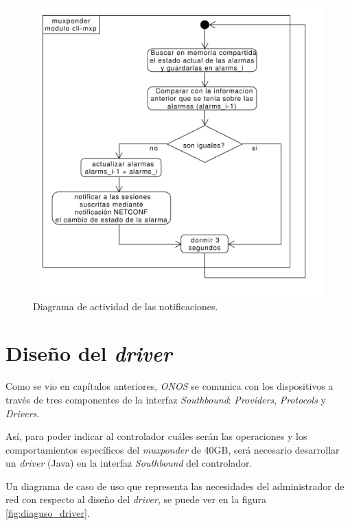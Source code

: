   \begin{figure}[H]
    \centering
    \includegraphics[scale=0.50]{Figures/actividad_modulo_notif.pdf}
    \caption{Diagrama de actividad de las notificaciones.}
    \label{fig:actividad_modulo_notif}
  \end{figure}


  \section{Diseño del \textit{driver}} 
  Como se vio en capítulos anteriores, \textit{ONOS} se comunica con los dispositivos a través de tres componentes de la interfaz \textit{Southbound}: \textit{Providers}, \textit{Protocols} y \textit{Drivers}.
  
  Así, para poder indicar al controlador cuáles serán las operaciones y los comportamientos específicos del \textit{muxponder} de 40GB, será necesario desarrollar un \textit{driver} (Java) en la interfaz \textit{Southbound} del controlador. 

  Un diagrama de caso de uso que representa las necesidades del administrador de red con respecto al diseño del \textit{driver}, se puede ver en la figura \ref{fig:diaguso_driver}. 


